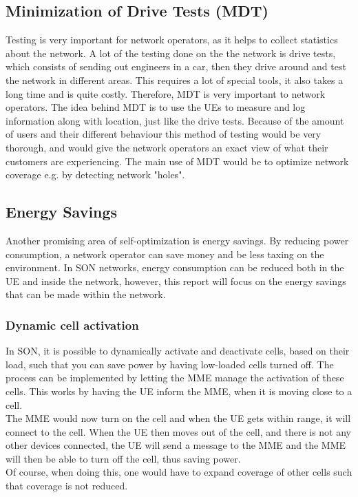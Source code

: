 \documentclass{report}
\begin{document}
\subsection{Minimization of Drive Tests (MDT)}
Testing is very important for network operators, as it helps to collect statistics about the network. A lot of the testing done on the the network is drive tests, which consists of sending out engineers in a car, then they drive around and test the network in different areas. This requires a lot of special tools, it also takes a long time and is quite costly. Therefore, MDT is very important to network operators. The idea behind MDT is to use the UEs to measure and log information along with location, just like the drive tests. Because of the amount of users and their different behaviour this method of testing would be very thorough, and would give the network operators an exact view of what their customers are experiencing. The main use of MDT would be to optimize network coverage e.g. by detecting network "holes". 

\subsection{Energy Savings}
Another promising area of self-optimization is energy savings. By reducing power consumption, a network operator can save money and be less taxing on the environment. In SON networks, energy consumption can be reduced both in the UE and inside the network, however, this report will focus on the energy savings that can be made within the network.

\subsubsection{Dynamic cell activation}
In SON, it is possible to dynamically activate and deactivate cells, based on their load, such that you can save power by having low-loaded cells turned off. 
The process can be implemented by letting the MME manage the activation of these cells. This works by having the UE inform the MME, when it is moving close to a cell. \\ The MME would now turn on the cell and when the UE gets within range, it will connect to the cell. When the UE then moves out of the cell, and there is not any other devices connected, the UE will send a message to the MME and the MME will then be able to turn off the cell, thus saving power. \\ Of course, when doing this, one would have to expand coverage of other cells such that coverage is not reduced. \cite{Feng2008}
\end{document}
